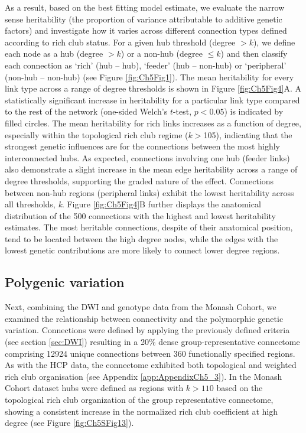 As a result, based on the best fitting model estimate, we evaluate the narrow sense heritability (the proportion of variance attributable to additive genetic factors) and investigate how it varies across different connection types defined according to rich club status. For a given hub threshold (degree $> k$), we define each node as a hub (degree $> k$) or a non-hub (degree $\leq k$) and then classify each connection as `rich' (hub -- hub), `feeder' (hub -- non-hub) or `peripheral' (non-hub -- non-hub) (see Figure \ref{fig:Ch5Fig1}). The mean heritability for every link type across a range of degree thresholds is shown in Figure \ref{fig:Ch5Fig4}A. A statistically significant increase in heritability for a particular link type compared to the rest of the network (one-sided Welch's $t$-test, $p < 0.05$) is indicated by filled circles. The mean heritability for rich links increases as a function of degree, especially within the topological rich club regime ($k > $105), indicating that the strongest genetic influences are for the connections between the most highly interconnected hubs. As expected, connections involving one hub (feeder links) also demonstrate a slight increase in the mean edge heritability across a range of degree thresholds, supporting the graded nature of the effect. Connections between non-hub regions (peripheral links) exhibit the lowest heritability across all thresholds, \textit{k}. Figure \ref{fig:Ch5Fig4}B further displays the anatomical distribution of the 500 connections with the highest and lowest heritability estimates. The most heritable connections, despite of their anatomical position, tend to be located between the high degree nodes, while the edges with the lowest genetic contributions are more likely to connect lower degree regions.

\subsection{Polygenic variation}

Next, combining the DWI and genotype data from the Monash Cohort, we examined the relationship between connectivity and the polymorphic genetic variation. Connections were defined by applying the previously defined criteria (see section \ref{sec:DWI}) resulting in a 20\% dense group-representative connectome comprising \num{12924} unique connections between 360 functionally specified regions. As with the HCP data, the connectome exhibited both topological and weighted rich club organisation (see Appendix \ref{app:AppendixCh5_3}). In the Monash Cohort dataset hubs were defined as regions with $k > 110$ based on the topological rich club organization of the group representative connectome, showing a consistent increase in the normalized rich club coefficient at high degree (see Figure \ref{fig:Ch5SFig13}).

